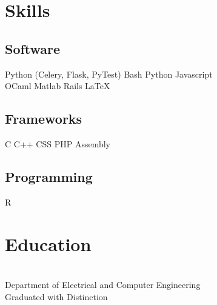 \documentclass[]{deedy-resume-openfont}
\begin{document}
%
%
\lastupdated

%
%

%
%

\begin{minipage}[t]{0.30\textwidth} 


\section{Skills}
\subsection{Software}
Python (Celery, Flask, PyTest) \textbullet{}   Bash \textbullet{} Python \textbullet{} Javascript \\
OCaml \textbullet{} Matlab \textbullet{} Rails \textbullet{} \LaTeX\ \\ 
\subsection{Frameworks}
C \textbullet{} C++ \textbullet{} CSS \textbullet{} PHP \textbullet{} Assembly \\
\subsection{Programming}
R
\sectionsep


\section{Education} 

 \\
Department of Electrical and Computer Engineering \\
Graduated with Distinction\\
\sectionsep


\end{minipage}
\end{document}
